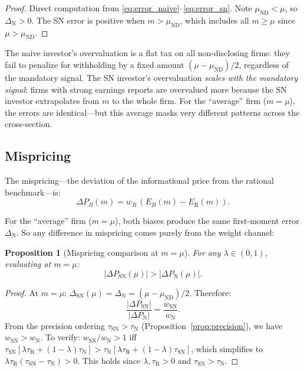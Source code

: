\documentclass[12pt]{article}
\theoremstyle{plain}
\newtheorem{proposition}{Proposition}
\theoremstyle{definition}
\newcommand{\ND}{\mathrm{ND}}
\newcommand{\R}{\mathrm{R}}
\newcommand{\SN}{\mathrm{SN}}
\newcommand{\N}{\mathrm{N}}
\begin{document}
\begin{proof}
Direct computation from \eqref{eq:error_naive}--\eqref{eq:error_sn}. Note $\mu_{\ND} < \mu$, so $\Delta_\N > 0$. The SN error is positive when $m > \mu_{\ND}$, which includes all $m \geq \mu$ since $\mu > \mu_{\ND}$.
\end{proof}

The naive investor's overvaluation is a flat tax on all non-disclosing firms: they fail to penalize for withholding by a fixed amount $(\mu - \mu_{\ND})/2$, regardless of the mandatory signal. The SN investor's overvaluation \emph{scales with the mandatory signal}: firms with strong earnings reports are overvalued more because the SN investor extrapolates from $m$ to the whole firm. For the ``average'' firm ($m = \mu$), the errors are identical---but this average masks very different patterns across the cross-section.


\subsection{Mispricing}

The mispricing---the deviation of the informational price from the rational benchmark---is:
\begin{equation}
\Delta P_B(m) = w_B\,(E_B(m) - E_\R(m)).
\label{eq:mispricing}
\end{equation}

For the ``average'' firm ($m = \mu$), both biases produce the same first-moment error $\Delta_\N$. So any difference in mispricing comes purely from the weight channel:

\begin{proposition}[Mispricing comparison at $m = \mu$]
\label{prop:mispricing}
For any $\lambda \in (0,1)$, evaluating at $m = \mu$:
\[
|\Delta P_\SN(\mu)| > |\Delta P_\N(\mu)|.
\]
\end{proposition}

\begin{proof}
At $m = \mu$: $\Delta_\SN(\mu) = \Delta_\N = (\mu - \mu_{\ND})/2$. Therefore:
\[
\frac{|\Delta P_\SN|}{|\Delta P_\N|} = \frac{w_\SN}{w_\N}.
\]
From the precision ordering $\tau_\SN > \tau_\N$ (Proposition~\ref{prop:precision}), we have $w_\SN > w_\N$. To verify: $w_\SN/w_\N > 1$ iff $\tau_\SN[\lambda\tau_\R + (1-\lambda)\tau_\N] > \tau_\N[\lambda\tau_\R + (1-\lambda)\tau_\SN]$, which simplifies to $\lambda\tau_\R(\tau_\SN - \tau_\N) > 0$. This holds since $\lambda, \tau_\R > 0$ and $\tau_\SN > \tau_\N$.
\end{proof}
\end{document}
